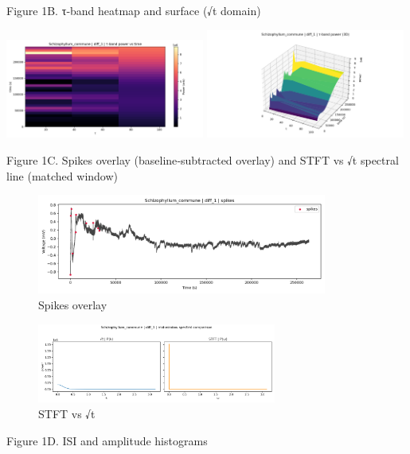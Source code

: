 \documentclass[
  11pt,
]{article}
\begin{document}
Figure 1B. τ‑band heatmap and surface (√t domain)

\includegraphics[width=0.49\textwidth,height=\textheight]{figs/Schizophyllum_commune_heatmap.png}
\includegraphics[width=0.49\textwidth,height=\textheight]{figs/Schizophyllum_commune_surface.png}

Figure 1C. Spikes overlay (baseline‑subtracted overlay) and STFT vs √t
spectral line (matched window)

\begin{figure}
\centering
\includegraphics[width=0.85\textwidth,height=\textheight]{figs/Schizophyllum_commune_spikes.png}
\caption{Spikes overlay}
\end{figure}

\begin{figure}
\centering
\includegraphics[width=0.7\textwidth,height=\textheight]{figs/Schizophyllum_commune_stft_vs_sqrt.png}
\caption{STFT vs √t}
\end{figure}

Figure 1D. ISI and amplitude histograms
\end{document}
